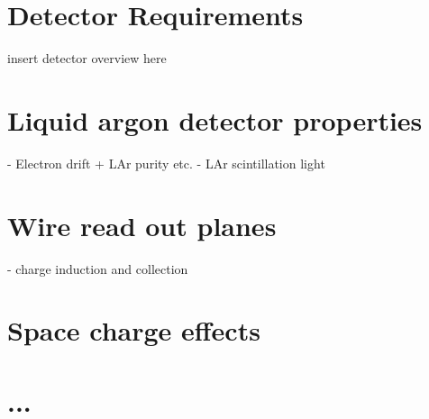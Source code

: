 
\section{Detector Requirements}

insert detector overview here

\section{Liquid argon detector properties}
- Electron drift + LAr purity etc.
- LAr scintillation light 

\section{Wire read out planes}
- charge induction and collection 

\section{Space charge effects}

\section{...}